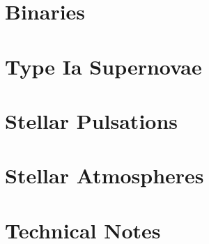 \documentclass{astro-bookshelf}
\begin{document}
\chapter{Binaries}\label{ch.binaries}


\chapter[Type Ia Supernovae]{Type Ia Supernovae}\label{ch.rotation}
%

\chapter{Stellar Pulsations}\label{s.pulsations}


\chapter[Stellar Atmospheres]{Stellar Atmospheres}\label{s.stellar-atmospheres}




\appendix
\chapter{Technical Notes}\label{s.technical-notes}


\backmatter


\end{document}
